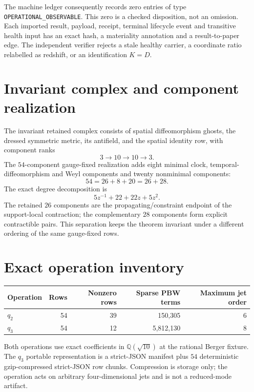 \documentclass[11pt]{article}
\begin{document}
The machine ledger consequently records zero entries of type
\texttt{OPERATIONAL\_OBSERVABLE}.  This zero is a checked disposition, not an
omission.  Each imported result, payload, receipt, terminal lifecycle event
and transitive health input has an exact hash, a materiality annotation and a
result-to-paper edge.  The independent verifier rejects a stale healthy
carrier, a coordinate ratio relabelled as redshift, or an identification
$K=D$.

\section{Invariant complex and component realization}

The invariant retained complex consists of spatial diffeomorphism ghosts,
the dressed symmetric metric, its antifield, and the spatial identity row,
with component ranks
\[
 3\longrightarrow10\longrightarrow10\longrightarrow3.
\]
The $54$-component gauge-fixed realization adds eight minimal clock,
temporal-diffeomorphism and Weyl components and twenty nonminimal components:
\[
 54=26+8+20=26+28.
\]
The exact degree decomposition is
\[
 5z^{-1}+22+22z+5z^2.
\]
The retained $26$ components are the propagating/constraint endpoint of the
support-local contraction; the complementary $28$ components form explicit
contractible pairs.  This separation keeps the theorem invariant under a
different ordering of the same gauge-fixed rows.

\section{Exact operation inventory}

\begin{center}
\begin{tabular}{lrrrr}
\toprule
Operation & Rows & Nonzero rows & Sparse PBW terms & Maximum jet order \\
\midrule
$q_2$ & 54 & 39 & 150,305 & 6 \\
$q_3$ & 54 & 12 & 5,812,130 & 8 \\
\bottomrule
\end{tabular}
\end{center}

Both operations use exact coefficients in $\mathbb Q(\sqrt{10})$ at the
rational Berger fixture.  The $q_3$ portable representation is a strict-JSON
manifest plus $54$ deterministic gzip-compressed strict-JSON row chunks.
Compression is storage only; the operation acts on arbitrary four-dimensional
jets and is not a reduced-mode artifact.
\end{document}
